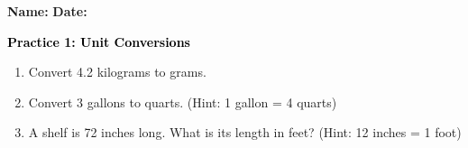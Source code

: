 \documentclass[12pt, letterpaper, fleqn]{article}
\begin{document}
\textbf{Name:} \underline{\hspace{5cm}}
\hfill
\textbf{Date:} \underline{\hspace{3cm}}\\

\begin{tcolorbox}[colback=customteal!20]
    \large\textcolor{black}{\textbf{Practice 1: Unit Conversions}}
\end{tcolorbox}
\begin{enumerate}[itemsep=3.5cm, leftmargin=0.6cm]
\item Convert 4.2 kilograms to grams.
\vspace{3.5cm}
\item Convert 3 gallons to quarts. (Hint: 1 gallon = 4 quarts)
\vspace{3.5cm}
\item A shelf is 72 inches long. What is its length in feet? (Hint: 12 inches = 1 foot)
\end{enumerate}
\end{document}
